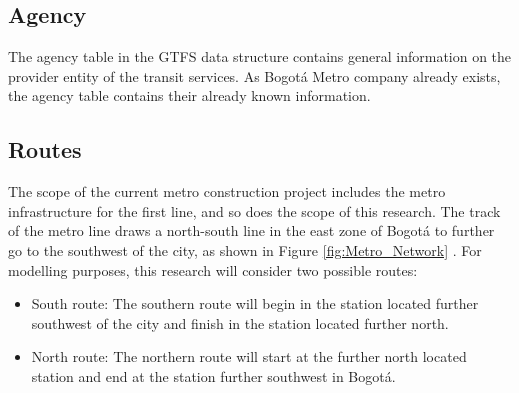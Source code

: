 \documentclass[12pt, a4paper]{report}
\begin{document}
\subsection{Agency}

The agency table in the GTFS data structure contains general information on the provider entity of the transit services. As Bogotá Metro company already exists, the agency table contains their already known information.


\begin{table}[ht]
\centering
\renewcommand{\arraystretch}{1.5}
\caption{Metro agency table.}
\label{tab:Metro_Agency}
\end{table}

\subsection{Routes}

The scope of the current metro construction project includes the metro infrastructure for the first line, and so does the scope of this research. The track of the metro line draws a north-south line in the east zone of Bogotá to further go to the southwest of the city, as shown in Figure \ref{fig:Metro_Network} . For modelling purposes, this research will consider two possible routes:

\begin{itemize}
\item South route: The southern route will begin in the station located further southwest of the city and finish in the station located further north.
\item North route: The northern route will start at the further north located station and end at the station further southwest in Bogotá.
\end{itemize}

\begin{table}[ht]
\centering
\renewcommand{\arraystretch}{1.5}
\caption{Metro routes table.}
\label{tab:Metro_Routes}
\end{table}
\end{document}
